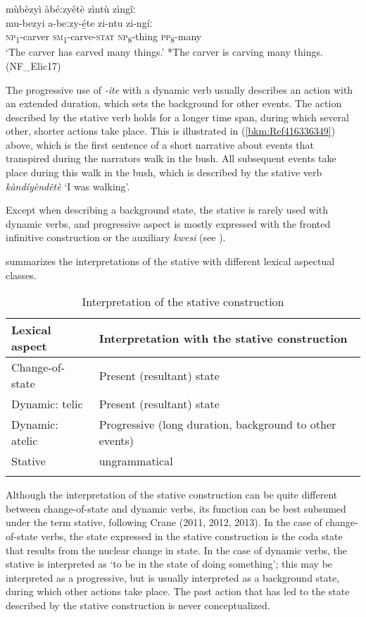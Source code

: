 \ea
\label{bkm:Ref494983787}
mùbèzyì àbéːzyêtè zìntù zìngîː\\
\gll mu-bezyi  a-beːzy-é̲te    zi-ntu    zi-ngíː\\
\textsc{np}\textsubscript{1}-carver  \textsc{sm}\textsubscript{1}-carve-\textsc{stat}  \textsc{np}\textsubscript{8}-thing  \textsc{pp}\textsubscript{8}-many\\
\glt ‘The carver has carved many things.’ *The carver is carving many things. (NF\_Elic17)
\z

The progressive use of \textit{-ite} with a dynamic verb usually describes an action with an extended duration, which sets the background for other events. The action described by the stative verb holds for a longer time span, during which several other, shorter actions take place. This is illustrated in (\ref{bkm:Ref416336349}) above, which is the first sentence of a short narrative about events that transpired during the narrators walk in the bush. All subsequent events take place during this walk in the bush, which is described by the stative verb \textit{kàndíyèndêtè} ‘I was walking’.

Except when describing a background state, the stative is rarely used with dynamic verbs, and progressive aspect is mostly expressed with the fronted infinitive construction or the auxiliary \textit{kwesi} (see ).

 summarizes the interpretations of the stative with different lexical aspectual classes.

\begin{table}
\label{bkm:Ref492378493}\caption{\label{tab:9:7}Interpretation of the stative construction}
\begin{tabularx}{\textwidth}{Xl}
\lsptoprule
Lexical aspect & Interpretation with the stative construction\\
\midrule
Change-of-state & Present (resultant) state \\
Dynamic: telic & Present (resultant) state\\
Dynamic: atelic & Progressive (long duration, background to other events)\\
Stative & ungrammatical\\
\lspbottomrule
\end{tabularx}
\end{table}

Although the interpretation of the stative construction can be quite different between change-of-state and dynamic verbs, its function can be best subsumed under the term stative, following Crane (2011, 2012, 2013). In the case of change-of-state verbs, the state expressed in the stative construction is the coda state that results from the nuclear change in state. In the case of dynamic verbs, the stative is interpreted as ‘to be in the state of doing something’; this may be interpreted as a progressive, but is usually interpreted as a background state, during which other actions take place. The past action that has led to the state described by the stative construction is never conceptualized.

